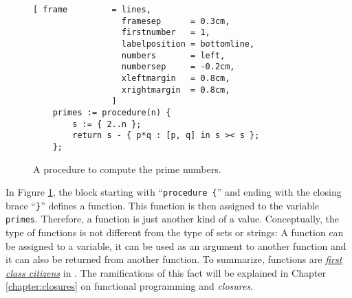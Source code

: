 \begin{figure}[!ht]
\centering
\begin{Verbatim}[ frame         = lines, 
                  framesep      = 0.3cm, 
                  firstnumber   = 1,
                  labelposition = bottomline,
                  numbers       = left,
                  numbersep     = -0.2cm,
                  xleftmargin   = 0.8cm,
                  xrightmargin  = 0.8cm,
                ]
    primes := procedure(n) { 
        s := { 2..n }; 
        return s - { p*q : [p, q] in s >< s }; 
    };
\end{Verbatim}
\vspace*{-0.3cm}
\caption{A procedure to compute the prime numbers.}
\label{fig:primes.stlx}
\end{figure}

In Figure \ref{fig:primes.stlx}, the block starting with ``\texttt{procedure \{}'' and
ending with the closing brace ``\texttt{\}}'' defines a function.  This function is then
assigned to the variable \texttt{primes}.  Therefore, a function is just another kind of a
value.  Conceptually, the type of functions is not different from the type of sets or
strings:  A function can be assigned to a variable, it can be used as an argument to
another function and it can also be returned from another function.  To summarize,
functions are \href{http://en.wikipedia.org/wiki/First-class_function}{\emph{first class citizens}} 
in \setlx.  The ramifications of
this fact will be explained in Chapter \ref{chapter:closures} on functional programming
and \emph{closures}.

